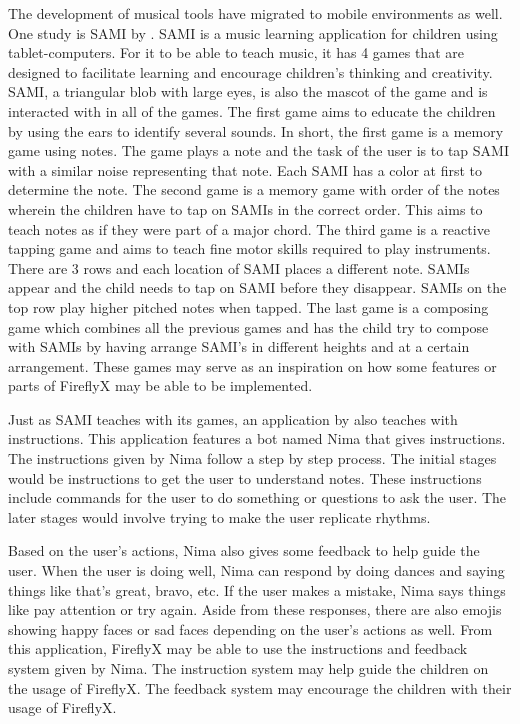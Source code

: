 The development of musical tools have migrated to mobile environments as well. One study is SAMI by \cite{paule2017music}. SAMI is a music learning application for children using tablet-computers. For it to be able to teach music, it has 4 games that are designed to facilitate learning and encourage children's thinking and creativity. SAMI, a triangular blob with large eyes, is also the mascot of the game and is interacted with in all of the games. The first game aims to educate the children by using the ears to identify several sounds. In short, the first game is a memory game using notes. The game plays a note and the task of the user is to tap SAMI with a similar noise representing that note. Each SAMI has a color at first to determine the note. The second game is a memory game with order of the notes wherein the children have to tap on SAMIs in the correct order. This aims to teach notes as if they were part of a major chord. The third game is a reactive tapping game and aims to teach fine motor skills required to play instruments. There are 3 rows and each location of SAMI places a different note. SAMIs appear and the child needs to tap on SAMI before they disappear. SAMIs on the top row play higher pitched notes when tapped. The last game is a composing game which combines all the previous games and has the child try to compose with SAMIs by having arrange SAMI’s in different heights and at a certain arrangement. These games may serve as an inspiration on how some features or parts of FireflyX may be able to be implemented.




Just as SAMI teaches with its games, an application by  also teaches with instructions. This application features a bot named Nima that gives instructions. The instructions given by Nima follow a step by step process. The initial stages would be instructions to get the user to understand notes. These instructions include commands for the user to do something or questions to ask the user. The later stages would involve trying to make the user replicate rhythms. 

Based on the user's actions, Nima also gives some feedback to help guide the user. When the user is doing well, Nima can respond by doing dances and saying things like that's great, bravo, etc. If the user makes a mistake, Nima says things like pay attention or try again. Aside from these responses, there are also emojis showing happy faces or sad faces depending on the user's actions as well. From this application, FireflyX may be able to use the instructions and feedback system given by Nima. The instruction system may help guide the children on the usage of FireflyX. The feedback system may encourage the children with their usage of FireflyX.

